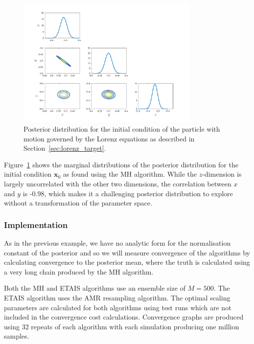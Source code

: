 \documentclass[final]{siamltex}
\begin{document}
\begin{figure}[htb]
\centering
\includegraphics[width=0.8\textwidth]{"figures/Lorenz_posterior"}
\caption{Posterior distribution for the initial condition of the particle with motion governed by the Lorenz equations as described in Section~\ref{sec:lorenz_target}.}
\label{fig:Lorenz_posterior}
\end{figure}

Figure~\ref{fig:Lorenz_posterior} shows the marginal distributions of the posterior distribution for the initial condition $\mathbf{x}_0$ as found using the MH algorithm. While the $z$-dimension is largely uncorrelated with the other two dimensions, the correlation between $x$ and $y$ is -0.98, which makes it a challenging posterior distribution to explore without a transformation of the parameter space.

\subsubsection{Implementation}\label{sec:lorenz_implementation}

As in the previous example, we have no analytic form for the normalisation constant of the posterior and so we will measure convergence of the algorithms by calculating convergence to the posterior mean, where the truth is calculated using a very long chain produced by the MH algorithm.

Both the MH and ETAIS algorithms use an ensemble size of $M=500$. The ETAIS algorithm uses the AMR resampling algorithm. The optimal scaling parameters are calculated for both algorithms using test runs which are not included in the convergence cost calculations. Convergence graphs are produced using 32 repeats of each algorithm with each simulation producing one million samples.
\end{document}
